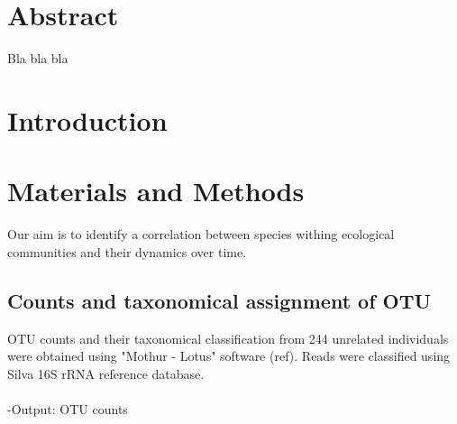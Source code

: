 \documentclass[10pt,letterpaper]{article}
\begin{document}
\vspace*{0.35in}

\begin{flushleft}
{\Large
\textbf{}
}
\newline
\end{flushleft}

\section*{Abstract}
Bla bla bla


\section*{Introduction}

\section*{Materials and Methods}
Our aim is to identify a correlation between species withing ecological communities and their dynamics over time. 
\\
\subsection*{Counts and taxonomical assignment of OTU}
OTU counts and their taxonomical classification from 244 unrelated individuals were obtained using "Mothur - Lotus" software (ref). Reads were classified using Silva 16S rRNA reference database. 
\\\\
-Output: OTU counts
\\
\end{document}
